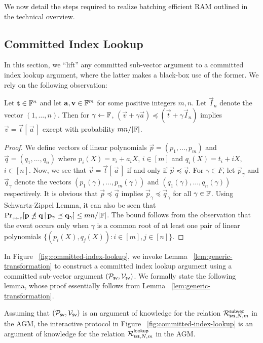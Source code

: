 We now detail the steps required to realize batching efficient RAM outlined in the technical overview.

\subsection{Committed Index Lookup}\label{subsec:committed-index-lookup}
In this section, we ``lift'' any committed sub-vector argument to a committed index lookup argument, where
the latter makes a black-box use of the former. We rely on the following observation:
\begin{lemma}\label{lem:generic-transformation}
Let $\mathbf{t}\in \mathbb{F}^n$ and let $\mathbf{a},\mathbf{v}\in \mathbb{F}^m$ for some positive integers $m,n$. Let $\vec{I}_n$ denote the vector $(1,\ldots,n)$.
Then for $\gamma\gets \mathbb{F}$, $(\vec{v}+\gamma \vec{a})\preceq (\vec{t} + \gamma \vec{I}_n)$ implies
$\vec{v}=\vec{t}[\,\vec{a}\,]$ except with probability $mn/|\mathbb{F}|$.
\end{lemma}
\begin{proof}
We define vectors of linear polynomials $\vec{p}=(p_1,\ldots,p_m)$ and $\vec{q}=(q_1,\ldots,q_n)$ where
$p_i(X) = v_i + a_i X$, $i\in [m]$ and $q_i(X) = t_i + i X$, $i\in [n]$. Now, we see that $\vec{v}=\vec{t}[\,\vec{a}\,]$
if and only if $\vec{p}\preceq \vec{q}$. For $\gamma\in F$, let $\vec{p}_\gamma$ and $\vec{q}_\gamma$ denote the vectors
$(p_1(\gamma),\ldots,p_m(\gamma))$ and $(q_1(\gamma),\ldots,q_n(\gamma))$ respectively. It is obvious that $\vec{p}\preceq \vec{q}$
implies $\vec{p}_\gamma\preceq \vec{q}_\gamma$ for all $\gamma\in \mathbb{F}$. Using Schwartz-Zippel Lemma, it can also be seen that
$\Pr_{{}_{\gamma\gets \mathbb{F}}}[\mathbf{p}\npreceq \mathbf{q} \,|\, \mathbf{p}_\gamma\preceq \mathbf{q}_\gamma]\leq mn/|\mathbb{F}|$. The bound
follows from the observation that the event occurs only when $\gamma$ is a common root of at least one pair of linear polynomials
$\{(p_i(X),q_j(X)): i\in [m], j\in [n]\}$.
\end{proof}
In Figure ~\ref{fig:committed-index-lookup}, we invoke Lemma ~\ref{lem:generic-transformation} to construct a
committed index lookup argument using a committed sub-vector argument $(\mathcal{P}_{\mathsf{sv}},\mathcal{V}_{\mathsf{sv}})$. We formally
state the following lemma, whose proof essentially follows from Lemma ~\ref{lem:generic-transformation}.

\begin{lemma}\label{lem:proto-committed-index-lookup}
Assuming that $(\mathcal{P}_{\mathsf{sv}},\mathcal{V}_{\mathsf{sv}})$ is an argument of knowledge for the relation $\mathcal{R}^{\mathsf{subvec}}_{\mathsf{srs},N,m}$ in the AGM, the interactive protocol
in Figure ~\ref{fig:committed-index-lookup} is an argument of knowledge for the relation $\mathcal{R}^{\mathsf{lookup}}_{\mathsf{srs},N,m}$ in the AGM.
\end{lemma}


